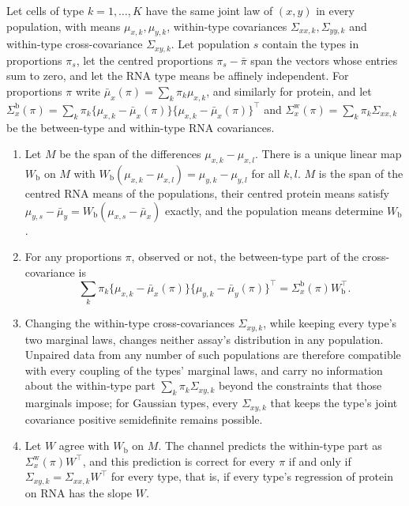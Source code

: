 \begin{proposition}\label{prop:mixture}
Let cells of type $k=1,\dots,K$ have the same joint law of $(x,y)$ in every
population, with means $\mu_{x,k},\mu_{y,k}$, within-type covariances
$\Sigma_{xx,k},\Sigma_{yy,k}$ and within-type cross-covariance
$\Sigma_{xy,k}$. Let population $s$ contain the types in proportions
$\pi_s$, let the centred proportions $\pi_s-\bar\pi$ span the vectors whose
entries sum to zero, and let the RNA type means be affinely independent. For
proportions $\pi$ write $\bar\mu_x(\pi)=\sum_k\pi_k\mu_{x,k}$, and similarly
for protein, and let
$\Sigma^{\mathrm b}_x(\pi)=\sum_k\pi_k\{\mu_{x,k}-\bar\mu_x(\pi)\}\{\mu_{x,k}-\bar\mu_x(\pi)\}^\top$
and $\Sigma^{\mathrm w}_x(\pi)=\sum_k\pi_k\Sigma_{xx,k}$ be the between-type
and within-type RNA covariances.
\begin{enumerate}
\item Let $M$ be the span of the differences $\mu_{x,k}-\mu_{x,l}$. There is
a unique linear map $W_{\mathrm b}$ on $M$ with
$W_{\mathrm b}(\mu_{x,k}-\mu_{x,l})=\mu_{y,k}-\mu_{y,l}$ for all $k,l$. $M$ is
the span of the centred RNA means of the populations, their centred protein
means satisfy $\mu_{y,s}-\bar\mu_y=W_{\mathrm b}(\mu_{x,s}-\bar\mu_x)$ exactly,
and the population means determine $W_{\mathrm b}$.
\item For any proportions $\pi$, observed or not, the between-type part of the
cross-covariance is
\[
 \sum_k\pi_k\{\mu_{x,k}-\bar\mu_x(\pi)\}\{\mu_{y,k}-\bar\mu_y(\pi)\}^\top
 =\Sigma^{\mathrm b}_x(\pi)W_{\mathrm b}^\top .
\]
\item Changing the within-type cross-covariances $\Sigma_{xy,k}$, while keeping
every type's two marginal laws, changes neither assay's distribution in any
population. Unpaired data from any number of such populations are therefore
compatible with every coupling of the types' marginal laws, and carry no
information about the within-type part $\sum_k\pi_k\Sigma_{xy,k}$ beyond the
constraints that those marginals impose; for Gaussian types, every
$\Sigma_{xy,k}$ that keeps the type's joint covariance positive semidefinite
remains possible.
\item Let $W$ agree with $W_{\mathrm b}$ on $M$. The channel predicts the
within-type part as $\Sigma^{\mathrm w}_x(\pi)W^\top$, and this prediction is
correct for every $\pi$ if and only if $\Sigma_{xy,k}=\Sigma_{xx,k}W^\top$ for
every type, that is, if every type's regression of protein on RNA has the
slope $W$.
\end{enumerate}
\end{proposition}

